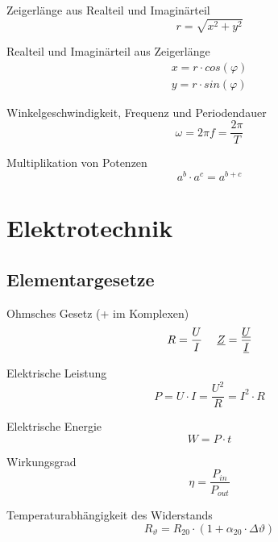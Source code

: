 \documentclass[11pt, a4paper, final, fleqn, twocolumn]{article}
\numberwithin{equation}{subsection}
\begin{document}
\noindent Zeigerlänge aus Realteil und Imaginärteil
\begin{equation}
    r = \sqrt{x^2 + y^2}
\end{equation}

\noindent Realteil und Imaginärteil aus Zeigerlänge
\begin{equation}
\begin{split}
    x = r \cdot cos(\varphi) \\
    y = r \cdot sin(\varphi)
\end{split}
\end{equation}

\noindent Winkelgeschwindigkeit, Frequenz und Periodendauer
\begin{equation}
    \omega = 2\pi f = \frac{2\pi}{T}
\end{equation}

\noindent Multiplikation von Potenzen
\begin{equation}
    a^b \cdot a^c = a^{b+c}
\end{equation}



\section{Elektrotechnik}

\subsection{Elementargesetze}

Ohmsches Gesetz (+ im Komplexen)
\begin{equation}
    R = \frac{U}{I} \hspace{3ex}
    \underline{Z} = \frac{\underline{U}}{\underline{I}}
\end{equation}

\noindent Elektrische Leistung
\begin{equation}
    P = U \cdot I = \frac{U^2}{R} = I^2 \cdot R
\end{equation}

\noindent Elektrische Energie
\begin{equation}
    W = P \cdot t
\end{equation}

\noindent Wirkungsgrad
\begin{equation}
    \eta = \frac{P_{in}}{P_{out}}
\end{equation}

\noindent Temperaturabhängigkeit des Widerstands
\begin{equation}
    R_\vartheta = R_{20}\cdot(1 + \alpha_{20} \cdot \Delta \vartheta)
\end{equation}
\end{document}
